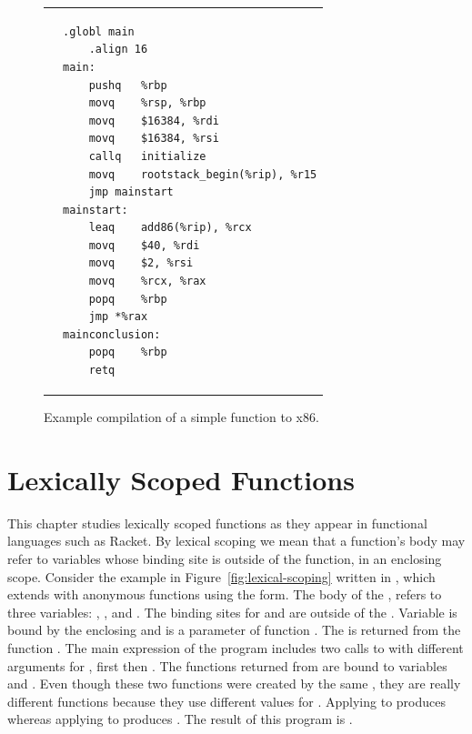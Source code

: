 \documentclass[11pt]{book}
\begin{document}
\begin{figure}[htbp]
\begin{tabular}{ll}
\begin{minipage}{0.3\textwidth}
\end{minipage}
&
\begin{minipage}{0.5\textwidth}
\begin{lstlisting}[basicstyle=\ttfamily\scriptsize]
	.globl main
	.align 16
main:
	pushq	%rbp
	movq	%rsp, %rbp
	movq	$16384, %rdi
	movq	$16384, %rsi
	callq	initialize
	movq	rootstack_begin(%rip), %r15
	jmp	mainstart
mainstart:
	leaq	add86(%rip), %rcx
	movq	$40, %rdi
	movq	$2, %rsi
	movq	%rcx, %rax
	popq	%rbp
	jmp	*%rax
mainconclusion:
	popq	%rbp
	retq
\end{lstlisting}
\end{minipage}
\end{tabular}
\caption{Example compilation of a simple function to x86.}
\label{fig:add-fun}
\end{figure}




\chapter{Lexically Scoped Functions}
\label{ch:Rlam}

This chapter studies lexically scoped functions as they appear in
functional languages such as Racket. By lexical scoping we mean that a
function's body may refer to variables whose binding site is outside
of the function, in an enclosing scope.
%
Consider the example in Figure~\ref{fig:lexical-scoping} written in
\LangLam{}, which extends \LangFun{} with anonymous functions using the
 form.  The body of the , refers to three
variables: , , and . The binding sites for
 and  are outside of the . Variable
 is bound by the enclosing  and  is a
parameter of function . The  is returned from the
function . The main expression of the program includes two
calls to  with different arguments for , first
 then . The functions returned from  are bound
to variables  and . Even though these two functions
were created by the same , they are really different
functions because they use different values for . Applying
 to  produces  whereas applying  to
 produces . The result of this program is .
\end{document}
